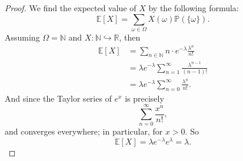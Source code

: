 \documentclass[12pt]{article}
\newcommand{\N}{\mathbb{N}} %
\newcommand{\R}{\mathbb{R}} %
\renewcommand{\P}{\mathbb{P}} %
\newcommand{\E}{\mathbb{E}} %
\newcommand{\<}{\left\langle} %
\renewcommand{\>}{\right\rangle} %
\begin{document}
\begin{proof}
    We find the expected value of $X$ by the following formula:
    \[\E[X] = \sum_{\omega\in\Omega}X(\omega)\P(\{\omega\}).\]
    Assuming $\Omega=\N$ and $X:\N\hookrightarrow\R$, then
    \begin{align*}
        \E[X]
            &= \sum_{n\in\N}n\cdot e^{-\lambda}\frac{\lambda^n}{n!} \\
            &= \lambda e^{-\lambda} \sum_{n=1}^\infty\frac{\lambda^{n-1}}{(n-1)!} \\
            &= \lambda e^{-\lambda} \sum_{n=0}^\infty\frac{\lambda^n}{n!}.
    \end{align*}
    And since the Taylor series of $e^x$ is precisely
    \[\sum_{n=0}^\infty\frac{x^n}{n!},\]
    and converges everywhere; in particular, for $x>0$. So
    \[\E[X] = \lambda e^{-\lambda} e^\lambda = \lambda.\]
    
\end{proof}
\end{document}
